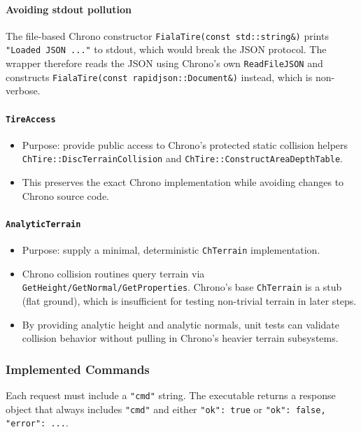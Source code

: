 \paragraph{Avoiding stdout pollution}
The file-based Chrono constructor \texttt{FialaTire(const std::string\&)} prints
\texttt{"Loaded JSON ..."} to stdout, which would break the JSON protocol. The wrapper
therefore reads the JSON using Chrono's own \texttt{ReadFileJSON} and constructs
\texttt{FialaTire(const rapidjson::Document\&)} instead, which is non-verbose.

\paragraph{\texttt{TireAccess}}
\begin{itemize}
  \item Purpose: provide public access to Chrono's protected static collision helpers
        \texttt{ChTire::DiscTerrainCollision} and \texttt{ChTire::ConstructAreaDepthTable}.
  \item This preserves the exact Chrono implementation while avoiding changes to Chrono source code.
\end{itemize}

\paragraph{\texttt{AnalyticTerrain}}
\begin{itemize}
  \item Purpose: supply a minimal, deterministic \texttt{ChTerrain} implementation.
  \item Chrono collision routines query terrain via \texttt{GetHeight/GetNormal/GetProperties}.
        Chrono's base \texttt{ChTerrain} is a stub (flat ground), which is insufficient for testing
        non-trivial terrain in later steps.
  \item By providing analytic height and analytic normals, unit tests can validate collision behavior
        without pulling in Chrono's heavier terrain subsystems.
\end{itemize}

\subsubsection{Implemented Commands}
Each request must include a \texttt{"cmd"} string.
The executable returns a response object that always includes \texttt{"cmd"} and either
\texttt{"ok": true} or \texttt{"ok": false, "error": ...}.

